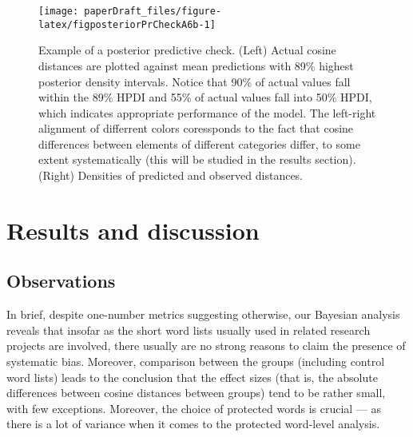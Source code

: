 \documentclass[
  12pt,
  dvipsnames,enabledeprecatedfontcommands]{scrartcl}
\begin{document}
\begin{figure}[H]

\begin{center}\texttt{[image: paperDraft\_files/figure-latex/figposteriorPrCheckA6b-1]} \end{center}
\caption{Example of a posterior predictive check. (Left) Actual cosine distances are plotted against mean predictions with 89\% highest posterior density intervals. Notice that 90\% of actual values fall within the 89\% HPDI and 55\% of actual values fall into 50\% HPDI, which indicates appropriate performance of the model. The left-right alignment of differrent colors coressponds to the fact that cosine differences between elements of different categories differ, to some extent systematically (this will be studied in the results section). (Right) Densities of predicted and observed distances.}
\label{fig:posteriorCheck1}
\end{figure}

\normalsize

\hypertarget{results-and-discussion}{%
\section{Results and discussion}\label{results-and-discussion}}

\label{sec:results}

\vspace{1mm}

\normalsize

\hypertarget{observations}{%
\subsection{Observations}\label{observations}}

\label{subsec:observations}

In brief, despite one-number metrics suggesting otherwise, our Bayesian
analysis reveals that insofar as the short word lists usually used in
related research projects are involved, there usually are no strong
reasons to claim the presence of systematic bias. Moreover, comparison
between the groups (including control word lists) leads to the
conclusion that the effect sizes (that is, the absolute differences
between cosine distances between groups) tend to be rather small, with
few exceptions. Moreover, the choice of protected words is crucial ---
as there is a lot of variance when it comes to the protected word-level
analysis.
\end{document}
